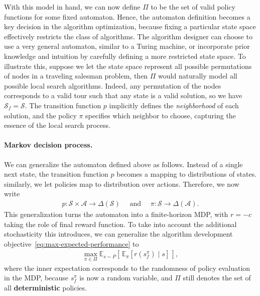 \documentclass[a4paper]{report}
\theoremstyle{definition}
\theoremstyle{plain}
\begin{document}
With this model in hand, we can now define $\Pi$ to be the set of valid policy
functions for some fixed automaton.
%
Hence, the automaton definition becomes a key decision in the algorithm
optimization, because fixing a particular state space effectively restricts the
class of algorithms.
%
The algorithm designer can choose to use a very general automaton, similar to a
Turing machine, or incorporate prior knowledge and intuition by carefully
defining a more restricted state space.
To illustrate this, suppose we let the state space represent all possible
permutations of nodes in a traveling salesman problem, then $\Pi$ would
naturally model all possible local search algorithms.
%
Indeed, any permutation of the nodes corresponds to a valid tour such that any
state is a valid solution, so we have $\mathcal{S}_f = \mathcal{S}$.
%
The transition function $p$ implicitly defines the \emph{neighborhood} of each
solution, and the policy $\pi$ specifies which neighbor to choose, capturing the
essence of the local search process.

\paragraph{Markov decision process.}
We can generalize the automaton defined above as follows.
Instead of a single next state, the transition function $p$ becomes a mapping to
distributions of states.
similarly, we let policies map to distribution over actions.
Therefore, we now write
\begin{align*}
  p : \mathcal{S} \times \mathcal{A} \rightarrow \Delta(\mathcal{S}) \quad \text{ and }
  \quad \pi : \mathcal{S} \rightarrow \Delta(\mathcal{A}) .
\end{align*}
%
This generalization turns the automaton into a finite-horizon MDP, with $r = {-c}$
taking the role of final reward function.
%
To take into account the additional stochasticity this introduces, we can generalize the algorithm development objective~\eqref{eq:max-expected-performance} to
\begin{align}\label{eq:max-mdp-performance}
  \max_{\pi \in \Pi} \mathbb{E}_{s \sim P} \left[ \, \mathbb{E}_\pi \left[ r(s_f^\pi) \mid s \right] \, \right] ,
\end{align}
where the inner expectation corresponds to the randomness of policy evaluation
in the MDP, because $s_f^\pi$ is now a random variable, and $\Pi$ still denotes
the set of all \textbf{deterministic} policies.
\end{document}

